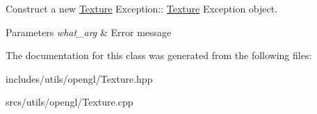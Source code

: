 Construct a new \hyperlink{struct_texture}{Texture} Exception\+:\+: \hyperlink{struct_texture}{Texture} Exception object. 


\begin{DoxyParams}{Parameters}
{\em what\+\_\+arg} & Error message \\
\hline
\end{DoxyParams}


The documentation for this class was generated from the following files\+:\begin{DoxyCompactItemize}
\item 
includes/utils/opengl/Texture.\+hpp\item 
srcs/utils/opengl/Texture.\+cpp\end{DoxyCompactItemize}
